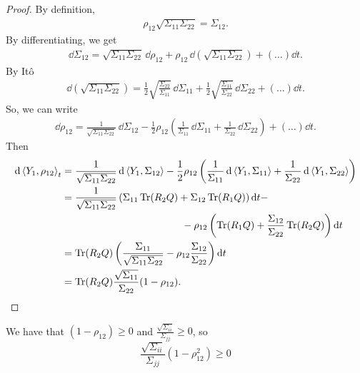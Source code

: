 \begin{proof}
    By definition,
    \begin{align*}
        \rho_{12}\sqrt{\Sigma_{11}\Sigma_{22}} = \Sigma_{12}.
    \end{align*}
    By differentiating, we get
    \begin{align*}
        \dd\Sigma_{12} = \sqrt{\Sigma_{11}\Sigma_{22}}\,\dd \rho_{12} + \rho_{12}\,\dd(\sqrt{\Sigma_{11}\Sigma_{22}}) + (\dots)\dd t.
    \end{align*}
    By Itô
    \begin{align*}
        \dd(\sqrt{\Sigma_{11}\Sigma_{22}}) = \frac{1}{2}\sqrt{\frac{\Sigma_{22}}{\Sigma_{11}}}\,\dd\Sigma_{11} + \frac{1}{2}\sqrt{\frac{\Sigma_{11}}{\Sigma_{22}}}\,\dd\Sigma_{22} + (\dots)\dd t.
    \end{align*}
    So, we can write
    \begin{align*}
          \dd\rho_{12} = \frac{1}{\sqrt{\Sigma_{11}\Sigma_{22}}}\,\dd \Sigma_{12} - \frac{1}{2}\rho_{12}\left(
          \frac{1}{\Sigma_{11}}\,\dd\Sigma_{11} +
          \frac{1}{\Sigma_{22}}\,\dd\Sigma_{22}\right) + (\dots)\dd t.
    \end{align*}
    Then
    \begin{align*}
        \dd\expval{Y_1,\rho_{12}}_t &= \frac{1}{\sqrt{\Sigma_{11}\Sigma_{22}}}\,\dd\expval{Y_1,\Sigma_{12}} - \frac{1}{2}\rho_{12} \left(
        \frac{1}{\Sigma_{11}}\,\dd\expval{Y_1,\Sigma_{11}} + \frac{1}{\Sigma_{22}}\,\dd\expval{Y_1,\Sigma_{22}}
        \right) \\
        &=
        \frac{1}{\sqrt{\Sigma_{11}\Sigma_{22}}}\left(\Sigma_{11}\Tr(R_2Q)+\Sigma_{12}\Tr(R_1Q)\right)\dd t - \\
        &\qquad\qquad\qquad\qquad\qquad\qquad - \rho_{12}\left(\Tr(R_1Q) + \frac{\Sigma_{12}}{\Sigma_{22}}\Tr(R_2Q)\right)\dd t \\
        &=
        \Tr(R_2Q)\left(\frac{\Sigma_{11}}{\sqrt{\Sigma_{11}\Sigma_{22}}}-\rho_{12}\frac{\Sigma_{12}}{\Sigma_{22}}\right)\dd t \\
        &=
        \Tr(R_2Q)\frac{\sqrt{\Sigma_{11}}}{\Sigma_{22}}(1-\rho_{12}). %
    \end{align*}
\end{proof}
We have that $(1-\rho_{12})\ge0$ and $\tfrac{\sqrt{\Sigma_{ii}}}{\Sigma_{jj}}\ge0$, so
\begin{equation*}
    \frac{\sqrt{\Sigma_{ii}}}{\Sigma_{jj}}(1-\rho_{12}^2) \ge 0
\end{equation*}
